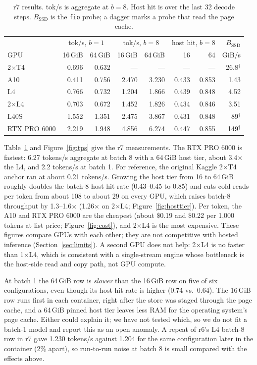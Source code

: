 \documentclass[11pt]{article}
\begin{document}
\begin{table}[htbp]
\centering\small
\caption{r7 results. tok/s is aggregate at $b=8$. Host hit is over the last 32
decode steps. $B_\text{SSD}$ is the \texttt{fio} probe; a dagger marks a probe
that read the page cache.}
\label{tab:r7}
\begin{tabular}{lrrrrrrr}
\toprule
& \multicolumn{2}{c}{tok/s, $b=1$} & \multicolumn{2}{c}{tok/s, $b=8$} &
\multicolumn{2}{c}{host hit, $b=8$} & $B_\text{SSD}$ \\
GPU & 16\,GiB & 64\,GiB & 16\,GiB & 64\,GiB & 16 & 64 & GiB/s \\
\midrule
2$\times$T4 & 0.696 & 0.632 & --- & --- & --- & --- & 26.8$^\dagger$ \\
A10 & 0.411 & 0.756 & 2.470 & 3.230 & 0.433 & 0.853 & 1.43 \\
L4 & 0.766 & 0.732 & 1.204 & 1.866 & 0.439 & 0.848 & 4.52 \\
2$\times$L4 & 0.703 & 0.672 & 1.452 & 1.826 & 0.434 & 0.846 & 3.51 \\
L40S & 1.552 & 1.351 & 2.475 & 3.867 & 0.431 & 0.848 & 89$^\dagger$ \\
RTX PRO 6000 & 2.219 & 1.948 & 4.856 & 6.274 & 0.447 & 0.855 & 149$^\dagger$ \\
\bottomrule
\end{tabular}
\end{table}

Table~\ref{tab:r7} and Figure~\ref{fig:tps} give the r7 measurements. The RTX
PRO 6000 is fastest: 6.27 tokens/s aggregate at batch 8 with a 64\,GiB host
tier, about 3.4$\times$ the L4, and 2.2 tokens/s at batch 1. For reference, the
original Kaggle 2$\times$T4 anchor ran at about 0.21 tokens/s. Growing the host
tier from 16 to 64\,GiB roughly doubles the batch-8 host hit rate (0.43--0.45 to
0.85) and cuts cold reads per token from about 108 to about 29 on every GPU,
which raises batch-8 throughput by 1.3--1.6$\times$ (1.26$\times$ on 2$\times$L4;
Figure~\ref{fig:hosttier}). Per token, the A10 and RTX PRO 6000 are the cheapest
(about \$0.19 and \$0.22 per 1,000 tokens at list price; Figure~\ref{fig:cost}),
and 2$\times$L4 is the most expensive. These figures compare GPUs with each
other; they are not competitive with hosted inference (Section~\ref{sec:limits}).
A second GPU does not help: 2$\times$L4 is no faster than 1$\times$L4, which is
consistent with a single-stream engine whose bottleneck is the host-side read
and copy path, not GPU compute.

At batch 1 the 64\,GiB row is \emph{slower} than the 16\,GiB row on five of six
configurations, even though its host hit rate is higher (0.74 vs.\ 0.64). The
16\,GiB row runs first in each container, right after the store was staged
through the page cache, and a 64\,GiB pinned host tier leaves less RAM for the
operating system's page cache. Either could explain it; we have not tested
which, so we do not fit a batch-1 model and report this as an open anomaly. A repeat of r6's L4 batch-8 row in r7 gave 1.230 tokens/s against
1.204 for the same configuration later in the container (2\% apart), so
run-to-run noise at batch 8 is small compared with the effects above.
\end{document}

